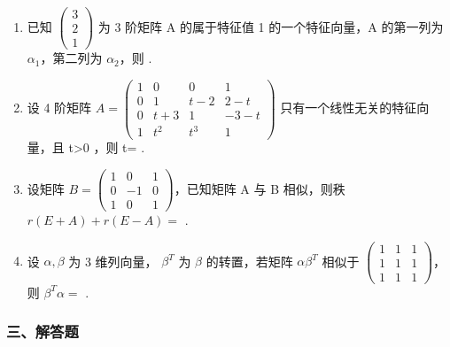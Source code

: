 \documentclass[12pt, a4paper]{ctexart}
\begin{document}
\begin{enumerate}[start=2]
    \item 已知 $ \begin{pmatrix}3\\2\\1\end{pmatrix} $ 为 3 阶矩阵 A 的属于特征值 1 的一个特征向量，A 的第一列为 $ \alpha_{1} $，第二列为 $ \alpha_{2} $，则 \underline{\hspace{2cm}}.

    \item 设 4 阶矩阵 $ A=\begin{pmatrix}1&0&0&1\\0&1&t-2&2-t\\0&t+3&1&-3-t\\1&t^{2}&t^{3}&1\end{pmatrix} $ 只有一个线性无关的特征向量，且 t>0 ，则 t= \underline{\hspace{2cm}}.

    \item 设矩阵 $ B = \begin{pmatrix} 1 & 0 & 1 \\ 0 & -1 & 0 \\ 1 & 0 & 1 \end{pmatrix} $，已知矩阵 A 与 B 相似，则秩 $ r(E + A) + r(E - A) = $ \underline{\hspace{2cm}}.

    \item 设 $ \alpha, \beta $ 为 3 维列向量， $ \beta^{T} $ 为 $ \beta $ 的转置，若矩阵 $ \alpha\beta^{T} $ 相似于 $ \begin{pmatrix}1 & 1 & 1 \\ 1 & 1 & 1 \\ 1 & 1 & 1\end{pmatrix} $，则 $ \beta^{T}\alpha= $ \underline{\hspace{2cm}}.
\end{enumerate}

\subsubsection*{三、解答题}
\end{document}
